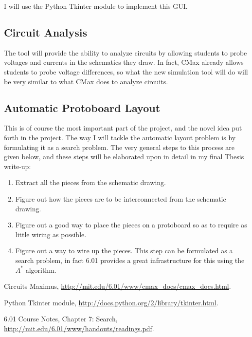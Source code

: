 \documentclass[12pt, doublespacing]{amsart}
\begin{document}
I will use the Python Tkinter module to implement this GUI\cite{tkinter}.

\subsection{Circuit Analysis}

The tool will provide the ability to analyze circuits by allowing students to probe voltages and currents in the schematics they draw. In fact, CMax already allows students to probe voltage differences, so what the new simulation tool will do will be very similar to what CMax does to analyze circuits.

\subsection{Automatic Protoboard Layout}

This is of course the most important part of the project, and the novel idea put forth in the project. The way I will tackle the automatic layout problem is by formulating it as a search problem. The very general steps to this process are given below, and these steps will be elaborated upon in detail in my final Thesis write-up:

\begin{enumerate}
\item Extract all the pieces from the schematic drawing.
\item Figure out how the pieces are to be interconnected from the schematic drawing.
\item Figure out a good way to place the pieces on a protoboard so as to require as little wiring as possible.
\item Figure out a way to wire up the pieces. This step can be formulated as a search problem, in fact 6.01 provides a great infrastructure for this using the $A^*$ algorithm\cite{6.01search}.
\end{enumerate}

\begin{thebibliography}{9}

Circuits Maximus,
\url{http://mit.edu/6.01/www/cmax_docs/cmax_docs.html}.

Python Tkinter module, \url{http://docs.python.org/2/library/tkinter.html}.

6.01 Course Notes, Chapter 7: Search, \url{http://mit.edu/6.01/www/handouts/readings.pdf}.

\end{thebibliography}
\end{document}

